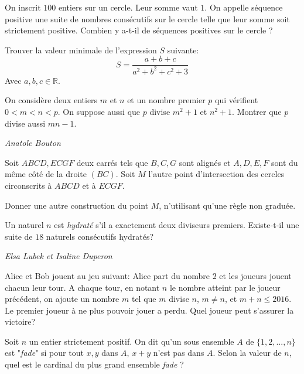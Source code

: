 \begin{exo}{}
On inscrit $100$ entiers sur un cercle. Leur somme vaut $1$. On appelle séquence positive une suite de nombres consécutifs sur le cercle telle que leur somme soit strictement positive. Combien y a-t-il de séquences positives sur le cercle ?
\end{exo}

\begin{exo}{}
Trouver la valeur minimale de l'expression $S$ suivante:
$$S=\dfrac{a+b+c}{a^2+b^2+c^2+3}$$
Avec $a,b,c\in \mathbb{R}$.
\end{exo}

\begin{exo}{}
On considère deux entiers $m$ et $n$ et un nombre premier $p$ qui vérifient $0<m<n<p$. On suppose aussi que $p$ divise $m^2+1$ et $n^2+1$. Montrer que $p$ divise aussi $mn-1$.

\medskip
\textit{Anatole Bouton}
\end{exo}

\begin{exo}{}
Soit $ABCD,ECGF$ deux carrés tels que $B,C,G$ sont alignés et $A,D,E,F$ sont
du même côté de la droite $(BC)$. Soit $M$ l'autre point d'intersection des cercles
circonscrits à $ABCD$ et à $ECGF$.

Donner une autre construction du point $M$, n'utilisant qu'une règle non graduée.
\end{exo}



\begin{exo}{}
Un naturel $n$ est \emph{hydraté} s'il a exactement deux diviseurs premiers. Existe-t-il une suite de $18$ naturels consécutifs hydratés?

\medskip
\textit{Elsa Lubek et Isaline Duperon}
\end{exo}


\begin{exo}{}
Alice et Bob jouent au jeu suivant:
Alice part du nombre $2$ et les joueurs jouent chacun leur tour.
A chaque tour, en notant $n$ le nombre atteint par le joueur précédent, on ajoute un nombre $m$ tel que $m$ divise $n$, $m \neq n$, et $m+n \leq 2016$.
Le premier joueur à ne plus pouvoir jouer a perdu.
Quel joueur peut s'assurer la victoire?
\end{exo}


\begin{exo}{}
Soit $n$ un entier strictement positif. On dit qu'un sous ensemble $A$ de $\{1,2,...,n\}$ est "\textit{fade}" si pour tout $x,y$ dans $A$, $x+y$ n'est pas dans $A$. Selon la valeur de $n$, quel est le cardinal du plus grand ensemble \textit{fade} ?
\end{exo}



